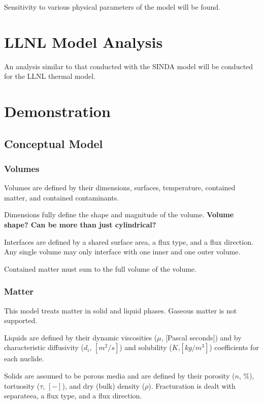 Sensitivity to various physical parameters of the model will be found. 

\section{LLNL Model Analysis}

An analysis similar to that conducted with the SINDA model will be conducted 
for the LLNL thermal model.

\section{Demonstration}

\subsection{Conceptual Model}

\subsubsection{Volumes}

Volumes are defined by their dimensions, surfaces, temperature, contained matter, and 
contained contaminants. 

Dimensions fully define the shape and magnitude of the volume.
\textbf{Volume shape? Can be more than just cylindrical?}

Interfaces are defined by a shared surface area, a flux type, and a flux 
direction. Any single volume may only interface with one inner and one outer 
volume. 

Contained matter must sum to the full volume of the volume.

\subsubsection{Matter}

This model treats matter in solid and liquid phases. Gaseous matter is not 
supported. 


Liquids are defined by their dynamic viscosities ($\mu$, [Pascal seconds]) and
by characteristic diffusivity ($d_i$, $[m^2/s]$) and solubility ($K$,$[kg/m^3]$) 
coefficients for each nuclide.  


Solids are assumed to be porous media and are defined by their porosity 
($n$, $\%$), tortuosity ($\tau$, $[-]$), and dry (bulk) density ($\rho$). 
Fracturation is dealt with separateea, a flux type, and a flux 
direction.  

